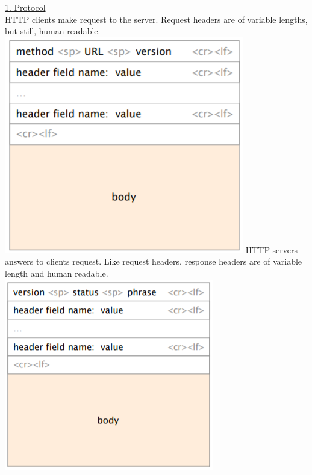 \documentclass[a4paper, fontsize=8pt, landscape, DIV=1]{scrartcl}
\begin{document}
\begin{multicols*}{4}
		\underline{1. Protocol}\\
		HTTP clients make request to the server. Request headers are of variable lengths, but still, human readable.\\
		\includegraphics[width=\columnwidth]{images/Application_Layer/http_request.png}
		HTTP servers answers to clients request. Like request headers, response headers are of variable length and human readable.\\ 
		\includegraphics[width=\columnwidth]{images/Application_Layer/http_answer.png}
		\par 
		

\end{multicols*}
\end{document}
